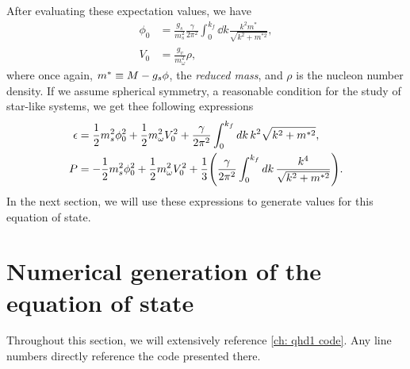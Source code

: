 After evaluating these expectation values, we have
\begin{align}
    \phi_0 &= \frac{g_s}{m_s^2} \frac{\gamma}{2\pi^2}\int_0^{k_f} \dd{k} \frac{k^2 m^*}{\sqrt{k^2 + m^{*2}}}, \label{eqn: rmf,phi0} \\
    V_0 &= \frac{g_v}{m_\omega^2} \rho, \label{eqn: rmf,V0}
\end{align}
where once again, $m^* \equiv M - g_s \phi$, the \emph{reduced mass}, and $\rho$ is the nucleon number density. If we assume spherical symmetry, a reasonable condition for the study of star-like systems, we get thee following expressions
\begin{align}
    \epsilon & = \frac{1}{2} m_s^2 \phi_0^2 + \frac{1}{2} m_\omega^2 V_0^2 + \frac{\gamma}{2\pi^2} \int_0^{k_f} \dd{k} k^2 \sqrt{k^2 + m^{*2}}, \label{eqn: rmf,eps}\\
    P & = -\frac{1}{2} m_s^2 \phi_0^2 + \frac{1}{2} m_\omega^2 V_0^2 + \frac{1}{3} \pqty{\frac{\gamma}{2\pi^2} \int_0^{k_f} \dd{k}\frac{k^4}{\sqrt{k^2 + m^{*2}}}}. \label{eqn: rmf,p}
\end{align}
In the next section, we will use these expressions to generate values for this equation of state.

\section{Numerical generation of the equation of state}

Throughout this section, we will extensively reference \autoref{ch: qhd1 code}. Any line numbers directly reference the code presented there.


